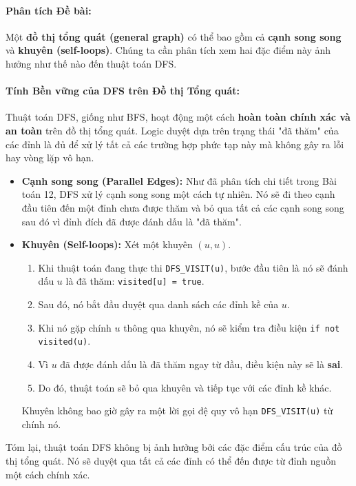 \documentclass[a4paper,12pt]{article}
\begin{document}
\paragraph{Phân tích Đề bài:}
Một \textbf{đồ thị tổng quát (general graph)} có thể bao gồm cả \textbf{cạnh song song} và \textbf{khuyên (self-loops)}. Chúng ta cần phân tích xem hai đặc điểm này ảnh hưởng như thế nào đến thuật toán DFS.

\paragraph{Tính Bền vững của DFS trên Đồ thị Tổng quát:}
Thuật toán DFS, giống như BFS, hoạt động một cách \textbf{hoàn toàn chính xác và an toàn} trên đồ thị tổng quát. Logic duyệt dựa trên trạng thái "đã thăm" của các đỉnh là đủ để xử lý tất cả các trường hợp phức tạp này mà không gây ra lỗi hay vòng lặp vô hạn.

\begin{itemize}
    \item \textbf{Cạnh song song (Parallel Edges):} Như đã phân tích chi tiết trong Bài toán 12, DFS xử lý cạnh song song một cách tự nhiên. Nó sẽ đi theo cạnh đầu tiên đến một đỉnh chưa được thăm và bỏ qua tất cả các cạnh song song sau đó vì đỉnh đích đã được đánh dấu là "đã thăm".
    
    \item \textbf{Khuyên (Self-loops):} Xét một khuyên $(u, u)$.
        \begin{enumerate}
            \item Khi thuật toán đang thực thi \texttt{DFS\_VISIT(u)}, bước đầu tiên là nó sẽ đánh dấu $u$ là đã thăm: \texttt{visited[u] = true}.
            \item Sau đó, nó bắt đầu duyệt qua danh sách các đỉnh kề của $u$.
            \item Khi nó gặp chính $u$ thông qua khuyên, nó sẽ kiểm tra điều kiện \texttt{if not visited(u)}.
            \item Vì $u$ đã được đánh dấu là đã thăm ngay từ đầu, điều kiện này sẽ là \textbf{sai}.
            \item Do đó, thuật toán sẽ bỏ qua khuyên và tiếp tục với các đỉnh kề khác.
        \end{enumerate}
    Khuyên không bao giờ gây ra một lời gọi đệ quy vô hạn \texttt{DFS\_VISIT(u)} từ chính nó.
\end{itemize}
Tóm lại, thuật toán DFS không bị ảnh hưởng bởi các đặc điểm cấu trúc của đồ thị tổng quát. Nó sẽ duyệt qua tất cả các đỉnh có thể đến được từ đỉnh nguồn một cách chính xác.
\end{document}
